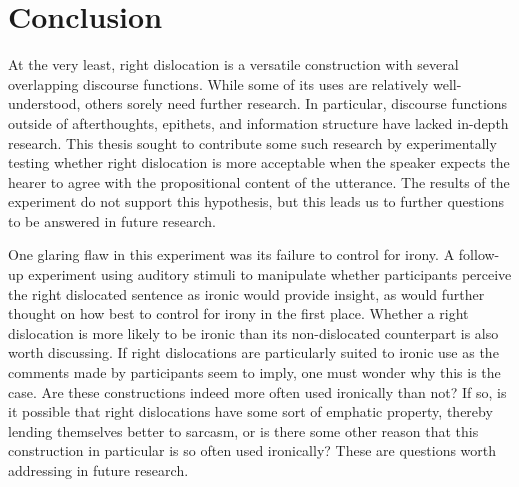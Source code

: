 \documentclass[titlepage,12pt]{article}
\begin{document}

\section{Conclusion} \label{conclude}

At the very least, right dislocation is a versatile construction with several overlapping discourse functions. While some of its uses are relatively well-understood, others sorely need further research. In particular, discourse functions outside of afterthoughts, epithets, and information structure have lacked in-depth research. This thesis sought to contribute some such research by experimentally testing whether right dislocation is more acceptable when the speaker expects the hearer to agree with the propositional content of the utterance. The results of the experiment do not support this hypothesis, but this leads us to further questions to be answered in future research.

One glaring flaw in this experiment was its failure to control for irony. A follow-up experiment using auditory stimuli to manipulate whether participants perceive the right dislocated sentence as ironic would provide insight, as would further thought on how best to control for irony in the first place. Whether a right dislocation is more likely to be ironic than its non-dislocated counterpart is also worth discussing. If right dislocations are particularly suited to ironic use as the comments made by participants seem to imply, one must wonder why this is the case. Are these constructions indeed more often used ironically than not? If so, is it possible that right dislocations have some sort of emphatic property, thereby lending themselves better to sarcasm, or is there some other reason that this construction in particular is so often used ironically? These are questions worth addressing in future research. 
\end{document}
